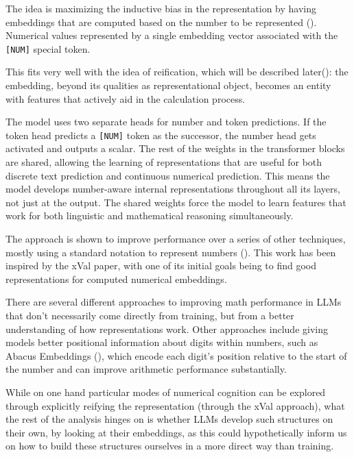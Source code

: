 \documentclass[
  a4paper, twoside, 10pt, titlepage]{book}
\begin{document}
The idea is maximizing the inductive bias in the representation by
having embeddings that are computed based on the number to be
represented (). Numerical
values represented by a single embedding vector associated with the
\passthrough{\lstinline![NUM]!} special token.

This fits very well with the idea of reification, which will be
described later(): the embedding,
beyond its qualities as representational object, becomes an entity with
features that actively aid in the calculation process.

The model uses two separate heads for number and token predictions. If
the token head predicts a \passthrough{\lstinline![NUM]!} token as the
successor, the number head gets activated and outputs a scalar. The rest
of the weights in the transformer blocks are shared, allowing the
learning of representations that are useful for both discrete text
prediction and continuous numerical prediction. This means the model
develops number-aware internal representations throughout all its
layers, not just at the output. The shared weights force the model to
learn features that work for both linguistic and mathematical reasoning
simultaneously.

The approach is shown to improve performance over a series of other
techniques, mostly using a standard notation to represent numbers
(). This work has been
inspired by the xVal paper, with one of its initial goals being to find
good representations for computed numerical embeddings.

There are several different approaches to improving math performance in
LLMs that don't necessarily come directly from training, but from a
better understanding of how representations work. Other approaches
include giving models better positional information about digits within
numbers, such as Abacus Embeddings (), which encode each digit's position relative to the start
of the number and can improve arithmetic performance substantially.

While on one hand particular modes of numerical cognition can be
explored through explicitly reifying the representation (through the
xVal approach), what the rest of the analysis hinges on is whether LLMs
develop such structures on their own, by looking at their embeddings, as
this could hypothetically inform us on how to build these structures
ourselves in a more direct way than training.
\end{document}
